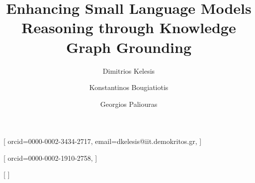 \documentclass[
]{ceurart}
\begin{document}


\title{Enhancing Small Language Models Reasoning through Knowledge Graph Grounding}


\author[1]{Dimitrios Kelesis}[%
orcid=0000-0002-3434-2717,
email=dkelesis@iit.demokritos.gr,
]
\fnmark[1]
\cormark[1]

\address[1]{Institute of Informatics and Telecommunications, National Center for Scientific Research ``Demokritos", Athens, Greece}

\author[1]{Konstantinos Bougiatiotis}[%
orcid=0000-0002-1910-2758,
]
\fnmark[1]

\author[1]{Georgios Paliouras}[%
]
\end{document}
